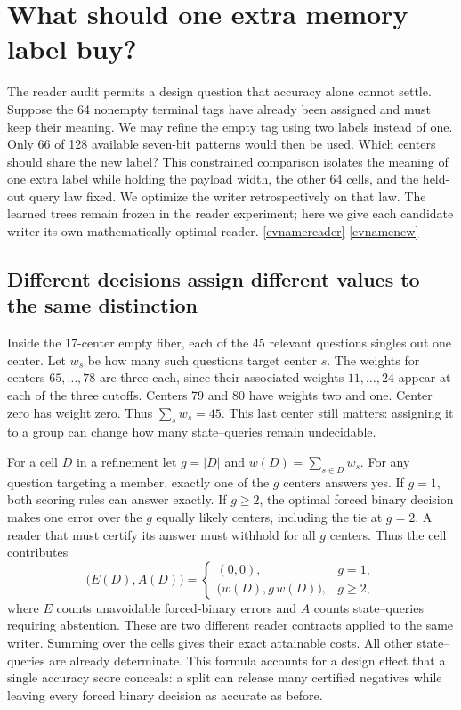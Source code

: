 \documentclass[11pt,letterpaper]{article}
\newcommand{\evref}[1]{\hyperlink{ev-#1}{\textsf{\small[\csname evname#1\endcsname]}}}
\begin{document}
\section{What should one extra memory label buy?}
\label{sec:frontier}
The reader audit permits a design question that accuracy alone cannot settle. Suppose the 64 nonempty terminal tags have already been assigned and must keep their meaning. We may refine the empty tag using two labels instead of one. Only 66 of 128 available seven-bit patterns would then be used. Which centers should share the new label? This constrained comparison isolates the meaning of one extra label while holding the payload width, the other 64 cells, and the held-out query law fixed. We optimize the writer retrospectively on that law. The learned trees remain frozen in the reader experiment; here we give each candidate writer its own mathematically optimal reader. \evref{reader} \evref{new}

\subsection{Different decisions assign different values to the same distinction}
Inside the 17-center empty fiber, each of the 45 relevant questions singles out one center. Let \(w_s\) be how many such questions target center \(s\). The weights for centers \(65,\ldots,78\) are three each, since their associated weights \(11,\ldots,24\) appear at each of the three cutoffs. Centers 79 and 80 have weights two and one. Center zero has weight zero. Thus \(\sum_s w_s=45\). This last center still matters: assigning it to a group can change how many state–queries remain undecidable.

For a cell \(D\) in a refinement let \(g=|D|\) and \(w(D)=\sum_{s\in D}w_s\). For any question targeting a member, exactly one of the \(g\) centers answers yes. If \(g=1\), both scoring rules can answer exactly. If \(g\ge2\), the optimal forced binary decision makes one error over the \(g\) equally likely centers, including the tie at \(g=2\). A reader that must certify its answer must withhold for all \(g\) centers. Thus the cell contributes
\[
 \bigl(E(D),A(D)\bigr)=
 \begin{cases}
 (0,0),&g=1,\\
 \bigl(w(D),g\,w(D)\bigr),&g\ge2 ,
 \end{cases}
\]
where \(E\) counts unavoidable forced-binary errors and \(A\) counts state–queries requiring abstention. These are two different reader contracts applied to the same writer. Summing over the cells gives their exact attainable costs. All other state–queries are already determinate. This formula accounts for a design effect that a single accuracy score conceals: a split can release many certified negatives while leaving every forced binary decision as accurate as before.
\end{document}

